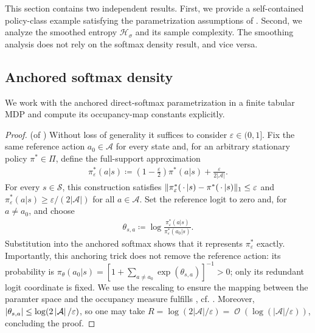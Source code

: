 \documentclass{article}
\theoremstyle{plain}
\theoremstyle{definition}
\theoremstyle{remark}
\def\SS{{\mathcal{S}}}
\def\AA{{\mathcal{A}}}
\DeclareMathOperator{\OOSym}{\mathcal{O}}
\newcommand{\OO}[1]{{\OOSym\!\left(#1\right)}}
\newcommand{\card}[1]{\left|#1\right|}
\def\epsilon{{\varepsilon}}
\newcommand{\innerEmpty}{\,\cdot\,}
\DeclarePairedDelimiter{\abs}{\lvert}{\rvert}
\DeclarePairedDelimiter{\norm}{\lVert}{\rVert}
\newcommand{\define}{\coloneqq}
\def\ss{{s}}
\def\HH{{\mathcal{H}}}
\def\aa{{a}}
\def\ss{{s}}
\begin{document}
This section contains two independent results. First, we provide a
self-contained policy-class example satisfying the parametrization
assumptions of . Second, we analyze the
smoothed entropy $\HH_\sigma$ and its sample complexity. The smoothing
analysis does not rely on the softmax density result, and vice versa.

\subsection{Anchored softmax density}
We work with the anchored direct-softmax parametrization in a finite
tabular MDP and compute its occupancy-map constants explicitly.

\begin{proof}(of )
 Without loss of generality it
 suffices to consider $\epsilon\in(0,1]$. Fix the same reference
 action $\aa_0\in\AA$ for every state and, for an arbitrary stationary policy
 $\pi^*\in\Pi$, define the full-support approximation
 \begin{align*}
  \pi^*_{\epsilon}(\aa\vert\ss)
  \define \left(1-\frac{\epsilon}{2}\right)\pi^*(\aa\vert\ss)
  + \frac{\epsilon}{2\card{\AA}}.
 \end{align*}
 For every $\ss\in\SS$, this construction satisfies
 $\norm{\pi^*_{\epsilon}(\innerEmpty{}\vert\ss)
   -\pi^*(\innerEmpty{}\vert\ss)}_1\leq\epsilon$ and
 $\pi^*_{\epsilon}(\aa\vert\ss)\geq
  \epsilon/(2\card{\AA})$ for all $\aa\in\AA$. Set the reference logit to
 zero and, for $\aa\neq\aa_0$, and choose
 \begin{align*}
  \theta_{\ss,\aa}
  \define \log\frac{\pi^*_{\epsilon}(\aa\vert\ss)}
  {\pi^*_{\epsilon}(\aa_0\vert\ss)}.
 \end{align*}
 Substitution into the anchored softmax shows that it represents
 $\pi^*_{\epsilon}$ exactly. Importantly, this anchoring trick
 does not remove the
 reference action: its probability is
 $\pi_\theta(\aa_0\vert\ss)=
  [1+\sum_{\aa\neq\aa_0}\exp(\theta_{\ss,\aa})]^{-1}>0$; only its redundant
 logit coordinate is fixed. We use the rescaling to ensure the mapping
 between the paramter space and the occupancy measure fulfills
 , cf.
 . Moreover,
 $\abs{\theta_{\ss,\aa}}\leq
  \log(2\card{\AA}/\epsilon)$, so one may take
 $R=\log(2\card{\AA}/\epsilon)=
  \OO{\log(\card{\AA}/\epsilon)}$, concluding the proof.
\end{proof}
\end{document}
